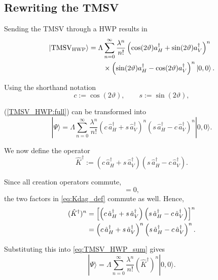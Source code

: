 \documentclass[%
 reprint,
 amsmath,amssymb,
 aps,
twocolumn
]{revtex4-2}
\begin{document}
\subsection{Rewriting the TMSV}
Sending the TMSV through a HWP results in
\begin{align}
\label{TMSV_HWP:full}
\ket{\text{TMSV}_{\text{HWP}}}=\Lambda&\sum_{n=0}^{\infty}\dfrac{\lambda^n}{n!}\left(\cos(2\vartheta)a_H^\dagger+\sin(2\vartheta)a_V^\dagger\right)^n\notag\\ &\times\left(\sin(2\vartheta)a_H^\dagger-\cos(2\vartheta)a_V^\dagger\right)^n\ket{0,0}.
\end{align}

Using the shorthand notation
\begin{equation}
c:=\cos(2\vartheta),
\qquad
s:=\sin(2\vartheta),
\end{equation}

(\ref{TMSV_HWP:full}) can be transformed into
\begin{equation}
|\Psi\rangle
=
\Lambda \sum_{n=0}^{\infty}
\frac{\lambda^n}{n!}
\left(c\,\hat a_H^\dagger + s\,\hat a_V^\dagger\right)^n
\left(s\,\hat a_H^\dagger - c\,\hat a_V^\dagger\right)^n
|0,0\rangle.
\label{eq:TMSV_HWP_sum}
\end{equation}

We now define the operator
\begin{equation}
\hat K^\dagger
:=
\left(c\,\hat a_H^\dagger + s\,\hat a_V^\dagger\right)
\left(s\,\hat a_H^\dagger - c\,\hat a_V^\dagger\right).
\label{eq:Kdag_def}
\end{equation}

Since all creation operators commute,
\begin{equation}
[\hat a_H^\dagger,\hat a_V^\dagger]=0,
\end{equation}
the two factors in \eqref{eq:Kdag_def} commute as well. Hence,
\begin{align}
(\hat K^\dagger)^n
& =
\left[
\left(c\,\hat a_H^\dagger + s\,\hat a_V^\dagger\right)
\left(s\,\hat a_H^\dagger - c\,\hat a_V^\dagger\right)
\right]^n \notag \\
& =
\left(c\,\hat a_H^\dagger + s\,\hat a_V^\dagger\right)^n
\left(s\,\hat a_H^\dagger - c\,\hat a_V^\dagger\right)^n.
\end{align}

Substituting this into \eqref{eq:TMSV_HWP_sum} gives
\begin{equation}
|\Psi\rangle
=
\Lambda \sum_{n=0}^{\infty}
\frac{\lambda^n}{n!}
(\hat K^\dagger)^n
|0,0\rangle.
\end{equation}
\end{document}
